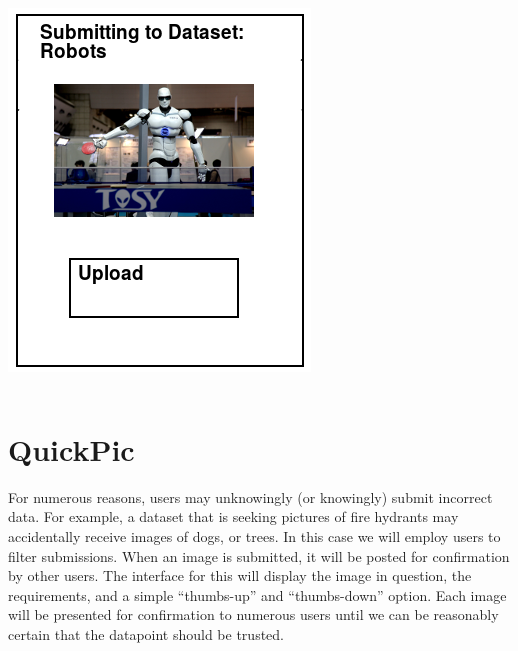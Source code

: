\documentclass[aspectratio=169]{beamer}
\begin{document}
\begin{frame}
\begin{columns}[c]
\begin{column}{0.5\columnwidth}
      \includegraphics[width=\columnwidth]{ss_photohunter_upload}
    \end{column}
  \end{columns}
\end{frame}

\section{QuickPic}

\begin{frame}
  For numerous reasons, users may unknowingly (or knowingly) submit
  incorrect data. For example, a dataset that is seeking pictures of
  fire hydrants may accidentally receive images of dogs, or trees. In
  this case we will employ users to filter submissions. When an image
  is
  submitted, it will be posted for confirmation by other users. The
  interface for this will display the image in question, the
  requirements, and a simple ``thumbs-up'' and ``thumbs-down'' option.
  Each image will be presented for confirmation to numerous users
  until
  we can be reasonably certain that the datapoint should be trusted.
\end{frame}
\end{document}
